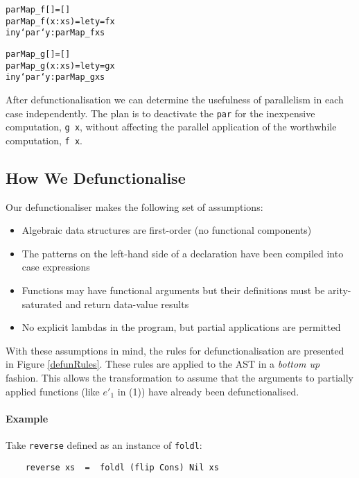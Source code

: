 \begin{alltt}
    parMap_f []     = []
    parMap_f (x:xs) = let y = f x
                      in y `par` y : parMap_f xs

    parMap_g []     = []
    parMap_g (x:xs) = let y = g x
                      in y `par` y : parMap_g xs
\end{alltt}


After defunctionalisation we can determine the usefulness of parallelism
in each case independently. The plan is to deactivate the \verb-par- for the
inexpensive computation, \verb-g x-, without affecting the parallel application
of the worthwhile computation, \verb-f x-.

\subsection{How We Defunctionalise}

Our defunctionaliser makes the following set of assumptions:

\begin{itemize}
  \item Algebraic data structures are first-order (no functional components)
  \item The patterns on the left-hand side of a declaration have been compiled
        into case expressions
  \item Functions may have functional arguments but their definitions must be
        arity-saturated and return data-value results
  \item No explicit lambdas in the program, but partial applications are permitted
\end{itemize}

With these assumptions in mind, the rules for defunctionalisation are presented
in Figure \ref{defunRules}. These rules are applied to the AST in a
\emph{bottom up} fashion. This allows the transformation to assume that the
arguments to partially applied functions (like $e'_{1}$ in (1)) have already
been defunctionalised.

\paragraph{Example}

Take \verb-reverse- defined as an instance of \verb-foldl-:

\begin{verbatim}
    reverse xs  =  foldl (flip Cons) Nil xs
\end{verbatim}

